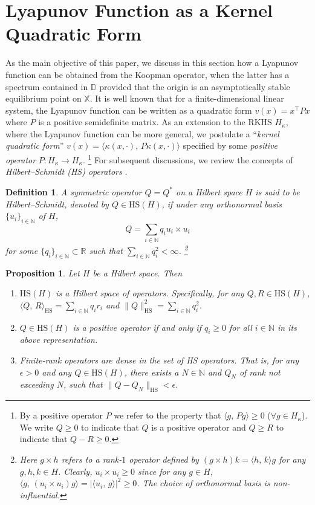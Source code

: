 \documentclass[english]{cccconf}
\renewcommand{\emph}[1]{\textit{#1}}
\newtheorem{proposition}{Proposition}
\newtheorem{definition}{Definition}
\newcommand{\mr}[1]{\mathrm{#1}}
\newcommand{\mbb}[1]{\mathds{#1}} %
\newcommand{\mR}{\mbb{R}}
\newcommand{\mN}{\mbb{N}}
\newcommand{\mD}{\mbb{D}}
\newcommand{\mX}{\mbb{X}}
\newcommand{\ip}[2]{\langle #1, \, #2 \rangle}
\begin{document}
\section{Lyapunov Function as a Kernel Quadratic Form}\label{sec:Lyapunov}
As the main objective of this paper, we discuss in this section how a Lyapunov function can be obtained from the Koopman operator, when the latter has a spectrum contained in $\mD$ provided that the origin is an asymptotically stable equilibrium point on $\mX$. 
It is well known that for a finite-dimensional linear system, the Lyapunov function can be written as a quadratic form $v(x) = x^\top Px$ where $P$ is a positive semidefinite matrix. 
As an extension to the RKHS $H_\kappa$, where the Lyapunov function can be more general, we postulate a ``\emph{kernel quadratic form}'' $v(x) = \ip{\kappa(x,\cdot)}{P\kappa(x, \cdot)}$ specified by some \emph{positive operator} $P: H_\kappa \rightarrow H_\kappa$. 
\footnote{By a positive operator $P$ we refer to the property that $\ip{g}{Pg}\geq 0$ ($\forall g\in H_\kappa$). 
We write $Q\geq 0$ to indicate that $Q$ is a positive operator and $Q\geq R$ to indicate that $Q-R\geq 0$.}
For subsequent discussions, we review the concepts of \emph{Hilbert--Schmidt (HS) operators} \cite{zhang2021lectures}. 
\begin{definition}
    A symmetric operator $Q=Q^\ast$ on a Hilbert space $H$ is said to be \emph{Hilbert--Schmidt}, denoted by $Q\in \mr{HS}(H)$, if under any orthonormal basis $\{u_i\}_{i\in \mN}$ of $H$, 
    \begin{equation}\label{eq:HS}
        \textstyle
        Q = \sum_{i\in\mN} q_iu_i\times u_i
    \end{equation}
    for some $\{q_i\}_{i\in\mN} \subset\mR$ such that $\sum_{i\in \mN} q_i^2<\infty$. \footnote{Here $g\times h$ refers to a rank-$1$ operator defined by $(g\times h)k = \ip{h}{k} g$ for any $g, h, k\in H$. Clearly, $u_i\times u_i \geq 0$ since for any $g\in H$, $\ip{g}{(u_i\times u_i)g} = |\ip{u_i}{g}|^2 \geq 0$. The choice of orthonormal basis is non-influential.}
\end{definition}
\begin{proposition}\label{prop:HS}
    Let $H$ be a Hilbert space. Then
    \begin{enumerate}
        \item $\mr{HS}(H)$ is a Hilbert space of operators. Specifically, for any $Q, R\in \mr{HS}(H)$, $\ip{Q}{R}_{\mr{HS}} = \sum_{i\in\mN} q_ir_i$ and $\|Q\|_{\mr{HS}}^2 = \sum_{i\in\mN} q_i^2$. 
        \item $Q\in \mr{HS}(H)$ is a positive operator if and only if $q_i \geq 0$ for all $i\in \mN$ in its above representation. 
        \item Finite-rank operators are dense in the set of HS operators. That is, for any $\epsilon>0$ and any $Q\in \mr{HS}(H)$, there exists a $N\in \mN$ and $Q_N$ of rank not exceeding $N$, such that $\|Q-Q_N\|_{\mr{HS}}<\epsilon$. 
    \end{enumerate}
\end{proposition} 
\end{document}
